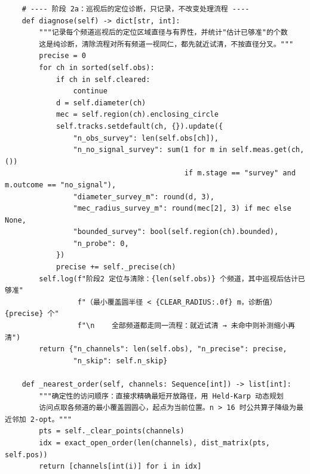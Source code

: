 \documentclass[UTF8, zihao=5,AutoFakeBold=2]{ctexart}
\begin{document}
\begin{lstlisting}
    # ---- 阶段 2a：巡视后的定位诊断，只记录，不改变处理流程 ----
    def diagnose(self) -> dict[str, int]:
        """记录每个频道巡视后的定位区域直径与有界性，并统计"估计已够准"的个数
        这是纯诊断，清除流程对所有频道一视同仁，都先就近试清，不按直径分叉。"""
        precise = 0
        for ch in sorted(self.obs):
            if ch in self.cleared:
                continue
            d = self.diameter(ch)
            mec = self.region(ch).enclosing_circle
            self.tracks.setdefault(ch, {}).update({
                "n_obs_survey": len(self.obs[ch]),
                "n_no_signal_survey": sum(1 for m in self.meas.get(ch, ())
                                          if m.stage == "survey" and m.outcome == "no_signal"),
                "diameter_survey_m": round(d, 3),
                "mec_radius_survey_m": round(mec[2], 3) if mec else None,
                "bounded_survey": bool(self.region(ch).bounded),
                "n_probe": 0,
            })
            precise += self._precise(ch)
        self.log(f"阶段2 定位与清除：{len(self.obs)} 个频道，其中巡视后估计已够准"
                 f"（最小覆盖圆半径 < {CLEAR_RADIUS:.0f} m，诊断值）{precise} 个"
                 f"\n    全部频道都走同一流程：就近试清 → 未命中则补测缩小再清")
        return {"n_channels": len(self.obs), "n_precise": precise,
                "n_skip": self.n_skip}

    def _nearest_order(self, channels: Sequence[int]) -> list[int]:
        """确定性的访问顺序：直接求精确最短开放路径，用 Held-Karp 动态规划
        访问点取各频道的最小覆盖圆圆心，起点为当前位置。n > 16 时公共算子降级为最近邻加 2-opt。"""
        pts = self._clear_points(channels)
        idx = exact_open_order(len(channels), dist_matrix(pts, self.pos))
        return [channels[int(i)] for i in idx]


\end{lstlisting}
\end{document}
